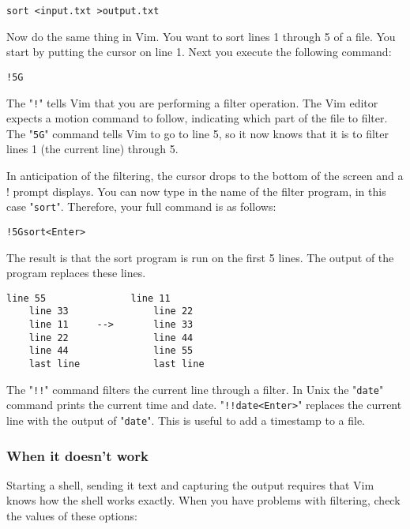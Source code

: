 {{\begin{Verbatim}[samepage=true]
 sort <input.txt >output.txt
\end{Verbatim}

Now do the same thing in Vim.
You want to sort lines 1 through 5 of a file.
You start by putting the cursor on line 1.
Next you execute the following command:

\begin{Verbatim}[samepage=true]
 !5G
\end{Verbatim}

The "\texttt{!}" tells Vim that you are performing a filter operation.
The Vim editor expects a motion command to follow, indicating which part of the file to filter.
The "\texttt{5G}" command tells Vim to go to line 5, so it now knows that it is to filter lines 1 (the current line) through 5.

In anticipation of the filtering, the cursor drops to the bottom of the screen and a ! prompt displays.
You can now type in the name of the filter program, in this case "\texttt{sort}".
Therefore, your full command is as follows:

\begin{Verbatim}[samepage=true]
 !5Gsort<Enter>
\end{Verbatim}

The result is that the sort program is run on the first 5 lines.
The output of the program replaces these lines.

\begin{Verbatim}[samepage=true]
    line 55               line 11
    line 33               line 22
    line 11     -->       line 33
    line 22               line 44
    line 44               line 55
    last line             last line
\end{Verbatim}

The "\texttt{!!}" command filters the current line through a filter.
In Unix the "\texttt{date}" command prints the current time and date.
"\texttt{!!date<Enter>}" replaces the current line with the output of "\texttt{date}".
This is useful to add a timestamp to a file.

\subsubsection{When it doesn't work}
Starting a shell, sending it text and capturing the output requires that Vim knows how the shell works exactly.
When you have problems with filtering, check the values of these options:

}}
